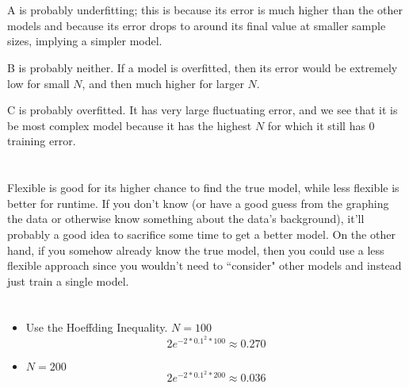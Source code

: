 \documentclass[12pt]{article}
\begin{document}
\section{}
A is probably underfitting; this is because its error is much higher than the other models and because its error drops to around its final value at smaller sample sizes, implying a simpler model.

B is probably neither. If a model is overfitted, then its error would be extremely low for small $ N $, and then much higher for larger $ N $.

C is probably overfitted. It has very large fluctuating error, and we see that it is be most complex model because it has the highest $ N $ for which it still has 0 training error.
\newpage

\section{}
Flexible is good for its higher chance to find the true model, while less flexible is better for runtime. If you don't know (or have a good guess from the graphing the data or otherwise know something about the data's background), it'll probably a good idea to sacrifice some time to get a better model. On the other hand, if you somehow already know the true model, then you could use a less flexible approach since you wouldn't need to ``consider" other models and instead just train a single model.
\newpage

\section{}
\begin{itemize}
	\item Use the Hoeffding Inequality. $ N = 100 $
	\[ 2e^{-2*0.1^2*100} \approx 0.270 \]
	
	\item $ N = 200 $
	\[ 2e^{-2*0.1^2*200} \approx 0.036 \]
\end{itemize}
\newpage
\end{document}
